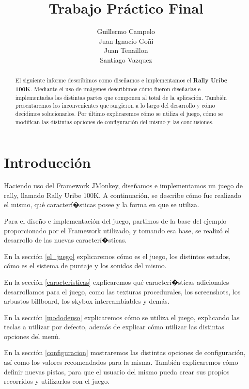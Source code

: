 \documentclass[a4paper,10pt]{article}
\title{Trabajo Pr\'actico Final}
\author{Guillermo Campelo\\Juan Ignacio Go\~ni\\Juan
Tenaillon\\Santiago Vazquez}
\begin{document}
\maketitle

\begin{abstract}
El siguiente informe describimos como dise\~namos e implementamos el
\textbf{Rally
Uribe
100K}. 
Mediante el uso de im\'agenes describimos c\'omo fueron dise\~nadas e
implementadas
las distintas partes que componen al total de la aplicaci\'on.  Tambi\'en
presentaremos los inconvenientes que surgieron a lo largo del desarrollo y
c\'omo decidimos solucionarlos.  Por \'ultimo explicaremos c\'omo se utiliza
el
juego,
c\'omo se modifican las distintas opciones de configuraci\'on del mismo y las
conclusiones.
\end{abstract}

\section{Introducci\'on}

Haciendo uso del Framework JMonkey, dise\~namos e implementamos un juego de
rally,
llamado Rally Uribe 100K.  A continuaci\'on, se describe c\'omo fue realizado el
mismo, qu\'e caracter\'i�sticas posee y la forma en que se utiliza.

Para el dise\~no e implementaci\'on del juego, partimos de la base del ejemplo
proporcionado por el Framework utilizado, y tomando esa base, se realiz\'o
el desarrollo de las nuevas caracter\'i�sticas.

En la secci\'on \ref{el_juego} explicaremos c\'omo es el juego, los distintos
estados, c\'omo es el sistema de puntaje y los sonidos del mismo.

En la secci\'on \ref{caracteristicas} explicaremos qu\'e caracter\'i�sticas
adicionales desarrollamos para el juego, como las texturas procedurales,
los screenshots, los arbustos billboard, los skybox intercambiables y dem\'as.

En la secci\'on \ref{mododeuso} explicaremos c\'omo se utiliza el juego,
explicando
las teclas a utilizar por defecto, adem\'as de explicar c\'omo utilizar las
distintas opciones del men\'u.

En la secci\'on \ref{configuracion} mostraremos las distintas opciones de
configuraci\'on, as\'i como los valores recomendados para la misma.  Tambi\'en
explicaremos c\'omo definir nuevas pistas, para que el usuario del mismo pueda
crear
sus propios recorridos y utilizarlos con el juego.
\end{document}
